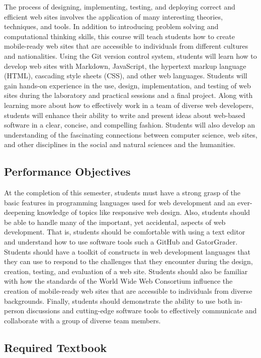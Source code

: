 \documentclass[11pt]{article}
\begin{document}
The process of designing, implementing, testing, and deploying correct and
efficient web sites involves the application of many interesting theories,
techniques, and tools. In addition to introducing problem solving and
computational thinking skills, this course will teach students how to create
mobile-ready web sites that are accessible to individuals from different
cultures and nationalities. Using the Git version control system, students will
learn how to develop web sites with Markdown, JavaScript, the hypertext markup
language (HTML), cascading style sheets (CSS), and other web languages. Students
will gain hands-on experience in the use, design, implementation, and testing of
web sites during the laboratory and practical sessions and a final project.
Along with learning more about how to effectively work in a team of diverse web
developers, students will enhance their ability to write and present ideas about
web-based software in a clear, concise, and compelling fashion. Students will
also develop an understanding of the fascinating connections between computer
science, web sites, and other disciplines in the social and natural sciences and
the humanities.

\subsection*{Performance Objectives}

At the completion of this semester, students must have a strong grasp of the
basic features in programming languages used for web development and an
ever-deepening knowledge of topics like responsive web design. Also, students
should be able to handle many of the important, yet accidental, aspects of web
development. That is, students should be comfortable with using a text editor
and understand how to use software tools such a GitHub and GatorGrader. Students
should have a toolkit of constructs in web development languages that they can
use to respond to the challenges that they encounter during the design,
creation, testing, and evaluation of a web site. Students should also be
familiar with how the standards of the World Wide Web Consortium influence the
creation of mobile-ready web sites that are accessible to individuals from
diverse backgrounds. Finally, students should demonstrate the ability to use
both in-person discussions and cutting-edge software tools to effectively
communicate and collaborate with a group of diverse team members.

\subsection*{Required Textbook}
\end{document}
